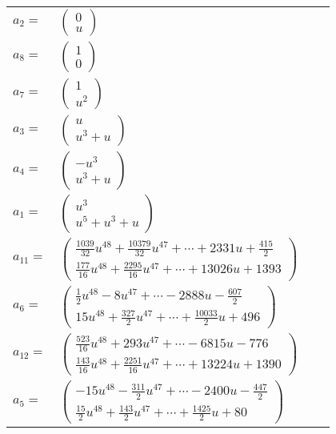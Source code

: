 \documentclass[1p]{elsarticle_modified}
\theoremstyle{definition}
\begin{document}
\begin{tabular}{m{7pt} m{180pt} m{7pt} m{180pt} }
\flushright $a_{2}=$&$\begin{pmatrix}0\\u\end{pmatrix}$ \\
\flushright $a_{8}=$&$\begin{pmatrix}1\\0\end{pmatrix}$ \\
\flushright $a_{7}=$&$\begin{pmatrix}1\\u^2\end{pmatrix}$ \\
\flushright $a_{3}=$&$\begin{pmatrix}u\\u^3+u\end{pmatrix}$ \\
\flushright $a_{4}=$&$\begin{pmatrix}- u^3\\u^3+u\end{pmatrix}$ \\
\flushright $a_{1}=$&$\begin{pmatrix}u^3\\u^5+u^3+u\end{pmatrix}$ \\
\flushright $a_{11}=$&$\begin{pmatrix}\frac{1039}{32} u^{48}+\frac{10379}{32} u^{47}+\cdots+2331 u+\frac{415}{2}\\\frac{177}{16} u^{48}+\frac{2295}{16} u^{47}+\cdots+13026 u+1393\end{pmatrix}$ \\
\flushright $a_{6}=$&$\begin{pmatrix}\frac{1}{2} u^{48}-8 u^{47}+\cdots-2888 u-\frac{607}{2}\\15 u^{48}+\frac{327}{2} u^{47}+\cdots+\frac{10033}{2} u+496\end{pmatrix}$ \\
\flushright $a_{12}=$&$\begin{pmatrix}\frac{523}{16} u^{48}+293 u^{47}+\cdots-6815 u-776\\\frac{143}{16} u^{48}+\frac{2251}{16} u^{47}+\cdots+13224 u+1390\end{pmatrix}$ \\
\flushright $a_{5}=$&$\begin{pmatrix}-15 u^{48}-\frac{311}{2} u^{47}+\cdots-2400 u-\frac{447}{2}\\\frac{15}{2} u^{48}+\frac{143}{2} u^{47}+\cdots+\frac{1425}{2} u+80\end{pmatrix}$ \\

\end{tabular}
\end{document}
